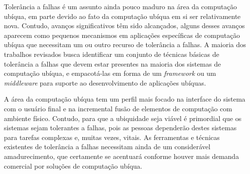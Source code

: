 Tolerância a falhas é um assunto ainda pouco maduro na área da computação ubíqua, em parte devido ao fato da computação ubíqua em si ser relativamente nova. Contudo, avanços significativos têm sido alcançados, alguns desses avanços aparecem como pequenos mecanismos em aplicações específicas de computação ubíqua que necessitam um ou outro recurso de tolerância a falhas. A maioria dos trabalhos revisados busca identificar um conjunto de técnicas básicas de tolerância a falhas que devem estar presentes na maioria dos sistemas de computação ubíqua, e empacotá-las em forma de um \emph{framework} ou um \emph{middleware} para suporte ao desenvolvimento de aplicações ubíquas.

A área da computação ubíqua tem um perfil mais focado na interface do sistema com o usuário final e na incremental fusão de elementos de computação com ambiente físico. Contudo, para que a ubiquidade seja viável é primordial que os sistemas sejam tolerantes a falhas, pois as pessoas dependerão destes sistemas para tarefas complexas e, muitas vezes, vitais. As ferramentas e técnicas existentes de tolerância a falhas necessitam ainda de um considerável amadurecimento, que certamente se acentuará conforme houver mais demanda comercial por soluções de computação ubíqua.
